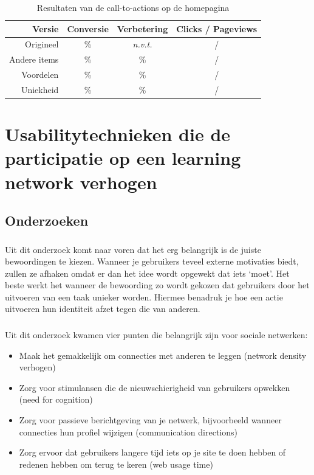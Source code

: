 \documentclass[a4paper, 10pt, pdftex]{report}
\begin{document}
        \begin{table}[ht]
        \centering
        \begin{tabular}{r|*{3}{c}}
          \textbf{Versie}                   & Conversie  & Verbetering    & Clicks / Pageviews \\ \hline
          Origineel                         & \%        & \emph{n.v.t.}   &  / \\
          Andere items                      & \%        & \%              &  / \\
          Voordelen                         & \%        & \%              &  / \\
          Uniekheid                         & \%        & \%              &  / \\
        \end{tabular}
        \caption{Resultaten van de call-to-actions op de homepagina}
        \label{tab:ctahome}
        \end{table}

  \newpage
  \chapter{Usabilitytechnieken die de participatie op een learning network verhogen}

    \section{Onderzoeken}
      \subsection{\cite{Beenen2004}}
      Uit dit onderzoek komt naar voren dat het erg belangrijk is de juiste bewoordingen te kiezen. Wanneer je gebruikers teveel externe motivaties biedt, zullen ze afhaken omdat er dan het idee wordt opgewekt dat iets `moet'. Het beste werkt het wanneer de bewoording zo wordt gekozen dat gebruikers door het uitvoeren van een taak unieker worden. Hiermee benadruk je hoe een actie uitvoeren hun identiteit afzet tegen die van anderen.

      \subsection{\cite{Sohn2005}}
        Uit dit onderzoek kwamen vier punten die belangrijk zijn voor sociale netwerken:
        \begin{itemize}
          \item Maak het gemakkelijk om connecties met anderen te leggen (network density verhogen)
          \item Zorg voor stimulansen die de nieuwschierigheid van gebruikers opwekken (need for cognition)
          \item Zorg voor passieve berichtgeving van je netwerk, bijvoorbeeld wanneer connecties hun profiel wijzigen (communication directions)
          \item Zorg ervoor dat gebruikers langere tijd iets op je site te doen hebben of redenen hebben om terug te keren (web usage time)
        \end{itemize}
\end{document}
